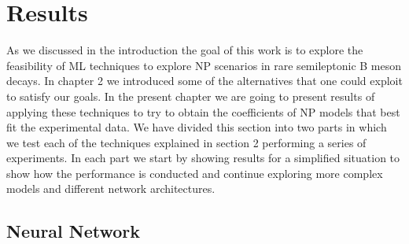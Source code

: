 \documentclass[a4paper,fleqn]{cas-dc}
\begin{document}
\section{Results}
As we discussed in the introduction the goal of this work is to explore the feasibility of ML techniques to explore NP scenarios in rare semileptonic B meson decays. In chapter 2 we introduced some of the alternatives that one could exploit to satisfy our goals. In the present chapter we are going to present results of applying these techniques to try to obtain the coefficients of NP models that best fit the experimental data. We have divided this section into two parts in which we test each of the techniques explained in section 2 performing a series of experiments. In each part we  start by showing results for a simplified situation to show how the performance is conducted and continue exploring more complex models and different network architectures. 
\subsection{Neural Network}
\end{document}
